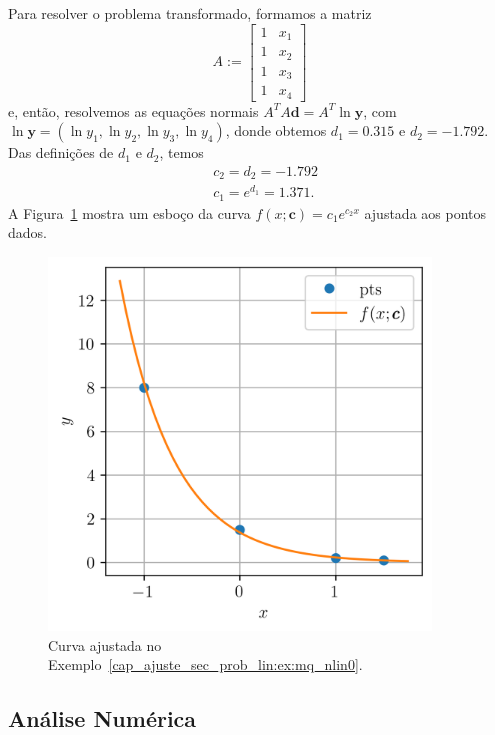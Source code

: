 \begin{ex}
Para resolver o problema transformado, formamos a matriz
\begin{equation}
  A :=
  \begin{bmatrix}
    1 & x_1 \\
    1 & x_2 \\
    1 & x_3 \\
    1 & x_4
  \end{bmatrix}
\end{equation}
e, então, resolvemos as equações normais $A^TA\pmb{d} = A^T\ln\pmb{y}$, com $\ln\pmb{y} = (\ln y_1, \ln y_2, \ln y_3, \ln y_4)$, donde obtemos $d_1 = 0.315$ e $d_2 = -1.792$. Das definições de $d_1$ e $d_2$, temos
\begin{align}
  &c_2 = d_2 = -1.792\\
  &c_1 = e^{d_1} = 1.371.
\end{align}
A Figura~\ref{cap_ajuste_sec_prob_lin:fig:ex_mq_nlin0} mostra um esboço da curva $f(x; \pmb{c}) = c_1e^{c_2x}$ ajustada aos pontos dados.

\begin{figure}[htb]
  \centering
  \includegraphics[width=4in]{cap_ajuste/dados/fig_mqUmPNLin/fig.png}
  \caption{Curva ajustada no Exemplo~\ref{cap_ajuste_sec_prob_lin:ex:mq_nlin0}.}
  \label{cap_ajuste_sec_prob_lin:fig:ex_mq_nlin0}
\end{figure}

\end{ex}

\subsection{Análise Numérica}
\badgeRevisar

